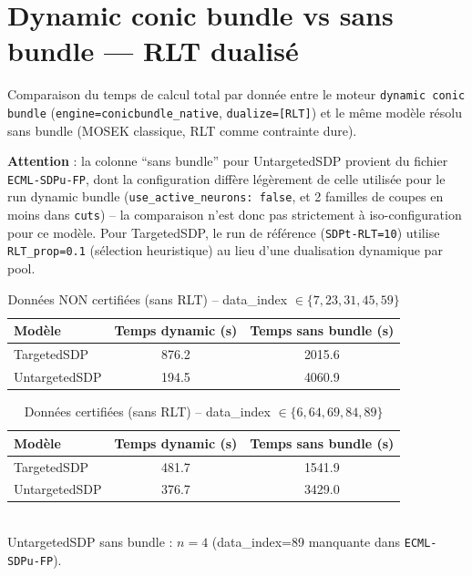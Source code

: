 \documentclass{article}
\begin{document}
\section*{Dynamic conic bundle vs sans bundle --- RLT dualis\'e}

Comparaison du temps de calcul total par donn\'ee entre le moteur
\texttt{dynamic conic bundle} (\texttt{engine=conicbundle\_native},
\texttt{dualize=[RLT]}) et le m\^eme mod\`ele r\'esolu sans bundle (MOSEK
classique, RLT comme contrainte dure).

\bigskip
\noindent\textbf{Attention} : la colonne ``sans bundle'' pour UntargetedSDP
provient du fichier \texttt{ECML-SDPu-FP}, dont la configuration diff\`ere
l\'eg\`erement de celle utilis\'ee pour le run dynamic bundle
(\texttt{use\_active\_neurons: false}, et 2 familles de coupes en moins dans
\texttt{cuts}) -- la comparaison n'est donc pas strictement \`a
iso-configuration pour ce mod\`ele. Pour TargetedSDP, le run de r\'ef\'erence
(\texttt{SDPt-RLT=10}) utilise \texttt{RLT\_prop=0.1} (s\'election heuristique)
au lieu d'une dualisation dynamique par pool.

\begin{table}[h]
\centering
\caption{Donn\'ees NON certifi\'ees (sans RLT) -- data\_index $\in \{7, 23, 31, 45, 59\}$}
\begin{tabular}{l S S}
\toprule
{Mod\`ele} & {Temps dynamic (s)} & {Temps sans bundle (s)} \\
\midrule
TargetedSDP   & 876.2  & 2015.6 \\
UntargetedSDP & 194.5  & 4060.9 \\
\bottomrule
\end{tabular}
\end{table}

\begin{table}[h]
\centering
\caption{Donn\'ees certifi\'ees (sans RLT) -- data\_index $\in \{6, 64, 69, 84, 89\}$}
\begin{tabular}{l S S}
\toprule
{Mod\`ele} & {Temps dynamic (s)} & {Temps sans bundle (s)} \\
\midrule
TargetedSDP   & 481.7 & 1541.9 \\
UntargetedSDP & 376.7 & 3429.0 \\
\bottomrule
\end{tabular}
\\[0.3em]
\footnotesize{UntargetedSDP sans bundle : $n=4$ (data\_index=89 manquante dans \texttt{ECML-SDPu-FP}).}
\end{table}
\end{document}

